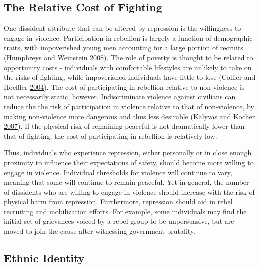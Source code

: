 \documentclass[12pt,]{book}
\theoremstyle{definition}
\theoremstyle{definition}
\theoremstyle{definition}
\theoremstyle{remark}
\begin{document}
\hypertarget{the-relative-cost-of-fighting}{%
\subsection{The Relative Cost of
Fighting}\label{the-relative-cost-of-fighting}}

One dissident attribute that can be altered by repression is the
willingness to engage in violence. Participation in rebellion is largely
a function of demographic traits, with impoverished young men accounting
for a large portion of recruits (Humphreys and Weinstein
\protect\hyperlink{ref-Humphreys2008}{2008}). The role of poverty is
thought to be related to opportunity costs - individuals with
comfortable lifestyles are unlikely to take on the risks of fighting,
while impoverished individuals have little to lose (Collier and Hoeffler
\protect\hyperlink{ref-Collier2004}{2004}). The cost of participating in
rebellion relative to non-violence is not necessarily static, however.
Indiscriminate violence against civilians can reduce the the risk of
participation in violence relative to that of non-violence, by making
non-violence more dangerous and thus less desirable (Kalyvas and Kocher
\protect\hyperlink{ref-Kalyvas2007}{2007}). If the physical risk of
remaining peaceful is not dramatically lower than that of fighting, the
cost of participating in rebellion is relatively low.

Thus, individuals who experience repression, either personally or in
close enough proximity to influence their expectations of safety, should
become more willing to engage in violence. Individual thresholds for
violence will continue to vary, meaning that some will continue to
remain peaceful. Yet in general, the number of dissidents who are
willing to engage in violence should increase with the risk of physical
harm from repression. Furthermore, repression should aid in rebel
recruiting and mobilization efforts. For example, some individuals may
find the initial set of grievances voiced by a rebel group to be
unpersuasive, but are moved to join the cause after witnessing
government brutality.

\hypertarget{ethnic-identity}{%
\subsection{Ethnic Identity}\label{ethnic-identity}}
\end{document}
